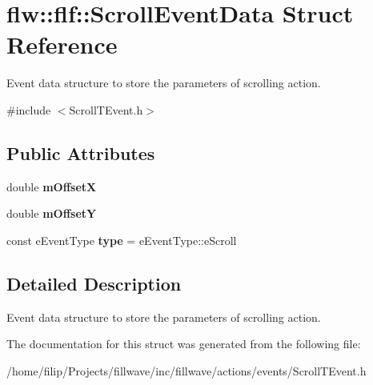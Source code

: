\hypertarget{structflw_1_1flf_1_1ScrollEventData}{}\section{flw\+:\+:flf\+:\+:Scroll\+Event\+Data Struct Reference}
\label{structflw_1_1flf_1_1ScrollEventData}


Event data structure to store the parameters of scrolling action.  




{\ttfamily \#include $<$Scroll\+T\+Event.\+h$>$}

\subsection*{Public Attributes}
\begin{DoxyCompactItemize}
\item 
double {\bfseries m\+OffsetX}\hypertarget{structflw_1_1flf_1_1ScrollEventData_ab30d06dae3ae247635ea2487095baed5}{}\label{structflw_1_1flf_1_1ScrollEventData_ab30d06dae3ae247635ea2487095baed5}

\item 
double {\bfseries m\+OffsetY}\hypertarget{structflw_1_1flf_1_1ScrollEventData_a2829241ca66065866e9578dcb93b3383}{}\label{structflw_1_1flf_1_1ScrollEventData_a2829241ca66065866e9578dcb93b3383}

\item 
const e\+Event\+Type {\bfseries type} = e\+Event\+Type\+::e\+Scroll\hypertarget{structflw_1_1flf_1_1ScrollEventData_ab8a0315893c0c238fce4852686a240c6}{}\label{structflw_1_1flf_1_1ScrollEventData_ab8a0315893c0c238fce4852686a240c6}

\end{DoxyCompactItemize}


\subsection{Detailed Description}
Event data structure to store the parameters of scrolling action. 

The documentation for this struct was generated from the following file\+:\begin{DoxyCompactItemize}
\item 
/home/filip/\+Projects/fillwave/inc/fillwave/actions/events/Scroll\+T\+Event.\+h\end{DoxyCompactItemize}
